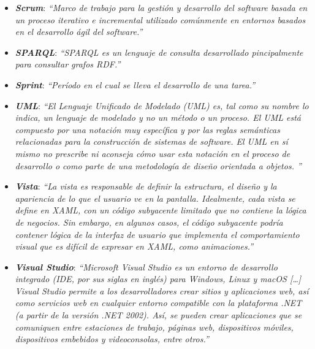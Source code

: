 \begin{itemize}
    \item \textbf{\textit{Scrum}}: \textit{“Marco de trabajo para la gestión y 
    desarrollo del software basada en un proceso iterativo e incremental 
    utilizado comúnmente en entornos basados en el desarrollo ágil del
    software.”} \autocite*{Alvarez2012}

    \item \textbf{\textit{SPARQL}}: \textit{“SPARQL es un lenguaje de consulta desarrollado pincipalmente para consultar
    grafos RDF.”} \autocite*{Sirin2007}

    \item \textbf{\textit{Sprint}}: \textit{“Período en el cual se lleva el desarrollo de una tarea.”} \autocite*{Alvarez2012}

    \item \textbf{\textit{UML}}: \textit{“El Lenguaje Unificado de Modelado (UML) es, tal como su nombre lo indica, un lenguaje de
    modelado y no un método o un proceso. El UML está compuesto por una notación muy específica y por las reglas semánticas relacionadas 
    para la construcción de sistemas de software. El UML en sí mismo no prescribe ni aconseja cómo usar esta notación en el proceso 
    de desarrollo o como parte de una metodología de diseño orientada a objetos. ”} \autocite*{Sparks2008}

    \item \textbf{\textit{Vista}}: \textit{“La vista es responsable de definir 
    la estructura, el diseño y la apariencia de lo que el usuario ve 
    en la pantalla. Idealmente, cada vista se define en XAML, con un 
    código subyacente limitado que no contiene la lógica de negocios. 
    Sin embargo, en algunos casos, el código subyacente podría contener 
    lógica de la interfaz de usuario que implementa el comportamiento 
    visual que es difícil de expresar en XAML, como animaciones.”}  \autocite*{MicrosoftMVVM}

    \item \textbf{\textit{Visual Studio}}: \textit{“Microsoft Visual Studio es un entorno de desarrollo integrado 
    (IDE, por sus siglas en inglés) para Windows, Linux y macOS [\dots] Visual Studio permite a los desarrolladores 
    crear sitios y aplicaciones web, así como servicios web en cualquier entorno compatible con la plataforma .NET 
    (a partir de la versión .NET 2002). Así, se pueden crear aplicaciones que se comuniquen entre estaciones de trabajo, 
    páginas web, dispositivos móviles, dispositivos embebidos y videoconsolas, entre otros.”} \autocite*{VisualStudio}


\end{itemize}
